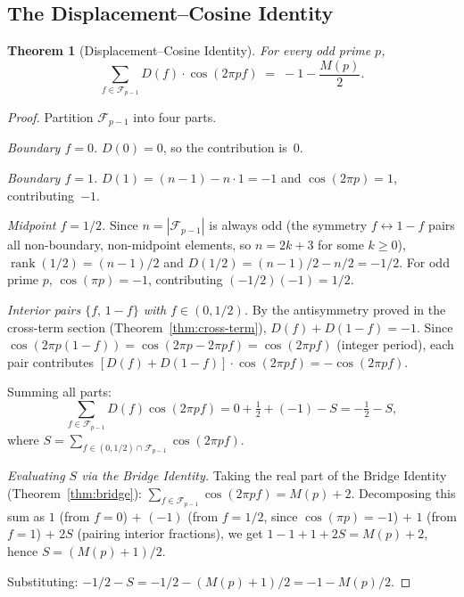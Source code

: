 \documentclass[11pt]{article}
\newtheorem{theorem}{Theorem}[section]
\theoremstyle{definition}
\newcommand{\F}{\mathcal{F}}
\begin{document}
\subsection{The Displacement--Cosine Identity}

\begin{theorem}[Displacement--Cosine Identity]\label{thm:disp-cos}
For every odd prime $p$,
\begin{equation}
  \sum_{f \in \F_{p-1}} D(f) \cdot \cos(2\pi p f)
  \;=\; -1 - \frac{M(p)}{2}.
\end{equation}
\end{theorem}

\begin{proof}
Partition $\F_{p-1}$ into four parts.

\smallskip\noindent\textit{Boundary $f=0$.}\quad
$D(0) = 0$, so the contribution is~$0$.

\smallskip\noindent\textit{Boundary $f=1$.}\quad
$D(1) = (n-1) - n \cdot 1 = -1$ and $\cos(2\pi p) = 1$,
contributing~$-1$.

\smallskip\noindent\textit{Midpoint $f = 1/2$.}\quad
Since $n = |\F_{p-1}|$ is always odd (the symmetry
$f \leftrightarrow 1-f$ pairs all non-boundary, non-midpoint
elements, so $n = 2k + 3$ for some $k \ge 0$),
$\operatorname{rank}(1/2) = (n-1)/2$ and
$D(1/2) = (n-1)/2 - n/2 = -1/2$.
For odd prime $p$, $\cos(\pi p) = -1$, contributing
$(-1/2)(-1) = 1/2$.

\smallskip\noindent\textit{Interior pairs $\{f,\, 1-f\}$ with $f \in (0,1/2)$.}\quad
By the antisymmetry proved in the cross-term section
(Theorem~\ref{thm:cross-term}), $D(f) + D(1-f) = -1$.
Since $\cos(2\pi p(1-f)) = \cos(2\pi p - 2\pi pf) = \cos(2\pi pf)$
(integer period), each pair contributes
$[D(f) + D(1-f)] \cdot \cos(2\pi pf) = -\cos(2\pi pf)$.

\smallskip\noindent Summing all parts:
\begin{equation*}
  \sum_{f \in \F_{p-1}} D(f)\cos(2\pi pf)
  = 0 + \tfrac{1}{2} + (-1) - S
  = -\tfrac{1}{2} - S,
\end{equation*}
where $S = \sum_{f \in (0,1/2) \cap \F_{p-1}} \cos(2\pi pf)$.

\smallskip\noindent\textit{Evaluating $S$ via the Bridge Identity.}\quad
Taking the real part of the Bridge Identity
(Theorem~\ref{thm:bridge}):
$\sum_{f \in \F_{p-1}} \cos(2\pi pf) = M(p) + 2$.
Decomposing this sum as $1$ (from $f=0$) $+$ $(-1)$ (from
$f = 1/2$, since $\cos(\pi p) = -1$) $+$ $1$ (from $f=1$)
$+$ $2S$ (pairing interior fractions), we get
$1 - 1 + 1 + 2S = M(p) + 2$, hence
$S = (M(p)+1)/2$.

\smallskip\noindent Substituting:
$-1/2 - S = -1/2 - (M(p)+1)/2 = -1 - M(p)/2$.
\end{proof}
\end{document}
